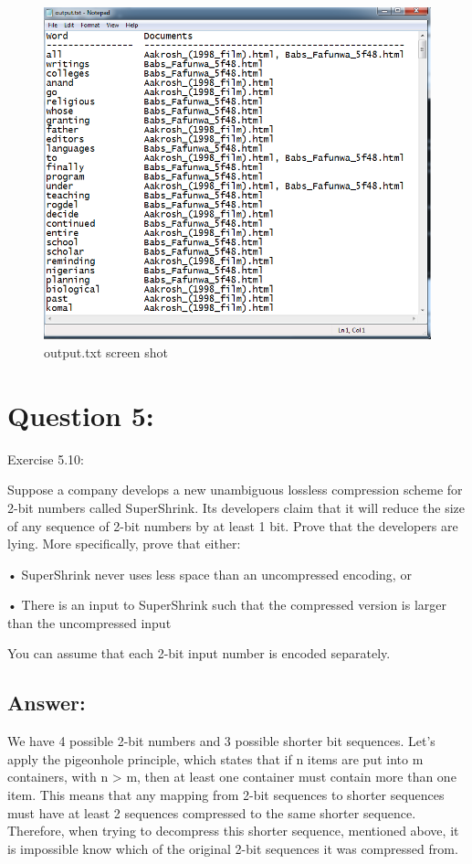 \documentclass[a4paper, 11pt]{article}
\begin{document}
\begin{figure}[h]
\caption{output.txt screen shot}
\centering
\includegraphics[scale=0.7]{Q4/output.png}
\end{figure}



\section*{Question 5:}
Exercise 5.10: 

Suppose a company develops a new unambiguous lossless compression scheme for 2-bit numbers called SuperShrink. Its developers claim that it will reduce the size of any sequence of 2-bit numbers by at least 1 bit. Prove that the developers are lying. More specifically, prove that either:

• SuperShrink never uses less space than an uncompressed encoding, or

• There is an input to SuperShrink such that the compressed version is larger than the uncompressed input

You can assume that each 2-bit input number is encoded separately.

\subsection*{Answer:}

We have 4 possible 2-bit numbers and 3 possible shorter bit sequences. Let's apply the pigeonhole principle, which states that if n items are put into m containers, with n > m, then at least one container must contain more than one item. This means that any mapping from 2-bit sequences to shorter sequences must have at least 2 sequences compressed to the same shorter sequence. Therefore, when trying to decompress this shorter sequence, mentioned above, it is impossible know which of the original 2-bit sequences it was compressed from.
\end{document}
